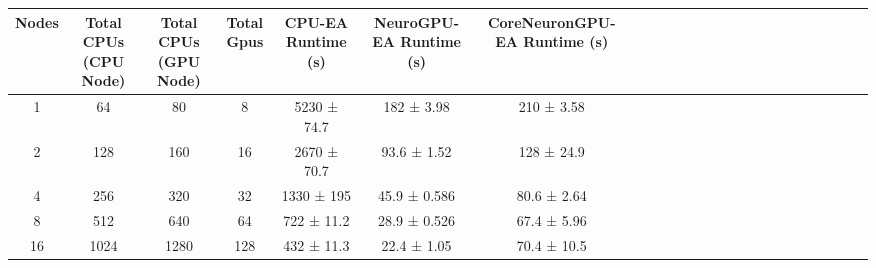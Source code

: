 \begin{tabular}{|c|c|c|c|c|c|c|c|c|c|c|c|c|c|c|c|c|c|c|c|c|c|c|c|}
\toprule
 Nodes &  Total CPUs (CPU Node) &  Total CPUs (GPU Node) &  Total Gpus & CPU-EA Runtime (s) & NeuroGPU-EA Runtime (s) & CoreNeuronGPU-EA Runtime (s) \\
\midrule
     1 &                     64 &                     80 &           8 &        5230 ± 74.7 &              182 ± 3.98 &                   210 ± 3.58 \\
     2 &                    128 &                    160 &          16 &        2670 ± 70.7 &             93.6 ± 1.52 &                   128 ± 24.9 \\
     4 &                    256 &                    320 &          32 &         1330 ± 195 &            45.9 ± 0.586 &                  80.6 ± 2.64 \\
     8 &                    512 &                    640 &          64 &         722 ± 11.2 &            28.9 ± 0.526 &                  67.4 ± 5.96 \\
    16 &                   1024 &                   1280 &         128 &         432 ± 11.3 &             22.4 ± 1.05 &                  70.4 ± 10.5 \\
\bottomrule
\end{tabular}
